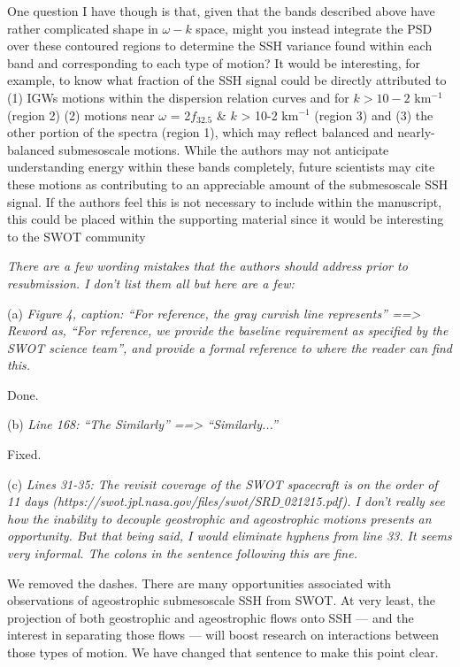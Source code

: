 \documentclass[11pt]{article}
\newcommand{\bdp}{\begin{description}}
\newcommand{\edp}{\end{description}}
\begin{document}
\begin{enumerate}
{One question I have though is that, given that the bands described above have rather
complicated shape in $\omega-k$ space, might you instead integrate the PSD over these contoured
regions to determine the SSH variance found within each band and corresponding to each
type of motion? It would be interesting, for example, to know what fraction of the SSH signal
could be directly attributed to (1) IGWs motions within the dispersion relation curves and for
$k > 10-2$ km$^{-1}$ (region 2) (2) motions near $\omega$ = 2$f_{32.5}$ \& $k$ > 10-2 km$^{-1}$ (region 3) and (3) the
other portion of the spectra (region 1), which may reflect balanced and nearly-balanced
submesoscale motions. While the authors may not anticipate understanding energy within
these bands completely, future scientists may cite these motions as contributing to an
appreciable amount of the submesoscale SSH signal. If the authors feel this is not necessary
to include within the manuscript, this could be placed within the supporting material since it
would be interesting to the SWOT community}

\item{\it  There are a few wording mistakes that the authors should address prior to resubmission. I
don’t list them all but here are a few:}

  \subitem (a) {\it Figure 4, caption: “For reference, the gray curvish line represents” ==> Reword as,
  “For reference, we provide the baseline requirement as specified by the SWOT
  science team”, and provide a formal reference to where the reader can find this.}

  \bdp
      \item \noindent Done.
  \edp

  \subitem (b) {\it   Line 168: “The Similarly” ==> “Similarly...''}

  \bdp
      \item \noindent Fixed.
  \edp

  \subitem (c) {\it Lines 31-35: The revisit coverage of the SWOT spacecraft is on the order of 11 days
  (https://swot.jpl.nasa.gov/files/swot/SRD$\_$021215.pdf). I don’t really see how the
  inability to decouple geostrophic and ageostrophic motions presents an opportunity.
  But that being said, I would eliminate hyphens from line 33. It seems very informal.
  The colons in the sentence following this are fine.}

  \bdp
    \item {\noindent We removed the dashes. There are many opportunities associated with observations
          of ageostrophic submesoscale SSH from SWOT. At very least, the projection of both geostrophic
          and ageostrophic flows onto SSH --- and the interest in separating those flows --- will boost research
          on interactions between those types of motion. We have changed that sentence to make this point clear. }
  \edp

\end{enumerate}


\end{document}
